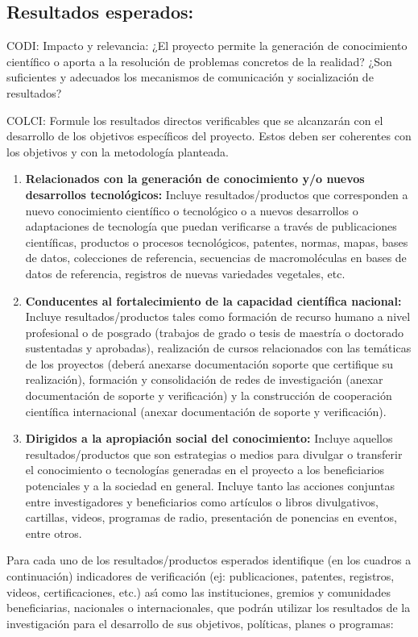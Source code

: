 \subsection{Resultados esperados:                          }
\begin{instrucciones}
CODI:  Impacto y relevancia:
¿El proyecto permite la generación de conocimiento científico o aporta a la resolución de problemas concretos de la realidad? ¿Son suficientes y adecuados los mecanismos de comunicación y socialización de resultados? 

 COLCI: Formule los resultados directos verificables que se
alcanzarán con el desarrollo de los objetivos específicos del proyecto. Estos deben ser coherentes
con los objetivos y con la metodología planteada.



  \begin{enumerate}
  \item \textbf{Relacionados con la generación de conocimiento y/o nuevos desarrollos
 tecnológicos:} Incluye resultados/productos que corresponden a nuevo
 conocimiento científico o tecnológico o a nuevos desarrollos o adaptaciones de
 tecnología que puedan verificarse a través de publicaciones científicas,
 productos o procesos tecnológicos, patentes, normas, mapas, bases de datos,
 colecciones de referencia, secuencias de macromoléculas en bases de datos de
 referencia, registros de nuevas variedades vegetales, etc.
\item \textbf{Conducentes al fortalecimiento de la capacidad científica
  nacional:} Incluye resultados/productos tales como formación de
  recurso humano a nivel profesional o de posgrado (trabajos de grado
  o tesis de maestría o doctorado sustentadas y aprobadas),
  realización de cursos relacionados con las temáticas de los
  proyectos (deberá anexarse documentación soporte que certifique su
  realización), formación y consolidación de redes de investigación
  (anexar documentación de soporte y verificación) y la construcción
  de cooperación científica internacional (anexar documentación de
  soporte y verificación).
\item \textbf{Dirigidos a la apropiación social del conocimiento:}
  Incluye aquellos resultados/productos que son estrategias o medios
  para divulgar o transferir el conocimiento o tecnologías generadas
  en el proyecto a los beneficiarios potenciales y a la sociedad en
  general. Incluye tanto las acciones conjuntas entre investigadores y
  beneficiarios como artículos o libros divulgativos, cartillas,
  videos, programas de radio, presentación de ponencias en eventos,
  entre otros.
  \end{enumerate}

  Para cada uno de los resultados/productos esperados identifique (en
  los cuadros a continuación) indicadores de verificación (ej:
  publicaciones, patentes, registros, videos, certificaciones, etc.)
  as\'\i{} como las instituciones, gremios y comunidades beneficiarias,
  nacionales o internacionales, que podrán utilizar los resultados de
  la investigación para el desarrollo de sus objetivos, políticas,
  planes o programas:

\end{instrucciones}

